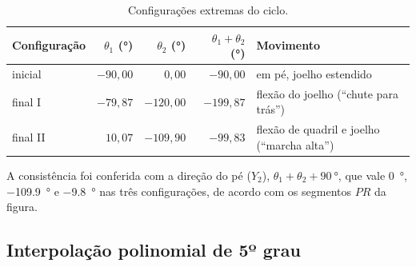 \documentclass[12pt,a4paper,twoside]{article}
\numberwithin{equation}{section}
\begin{document}
\begin{table}[htbp]
  \centering
  \caption{Configurações extremas do ciclo.}
  \label{tab:config}
  \small
  \begin{tabular}{lrrrl}
    \toprule
    Configuração & $\theta_1$ (\si{\degree}) & $\theta_2$ (\si{\degree}) & $\theta_1+\theta_2$ (\si{\degree}) & Movimento \\
    \midrule
    inicial  & $-90{,}00$ & $0{,}00$ & $-90{,}00$ & em pé, joelho estendido \\
    final I  & $-79{,}87$ & $-120{,}00$ & $-199{,}87$ & flexão do joelho (``chute para trás'') \\
    final II & $10{,}07$ & $-109{,}90$ & $-99{,}83$ & flexão de quadril e joelho (``marcha alta'') \\
    \bottomrule
  \end{tabular}
\end{table}

A consistência foi conferida com a direção do pé ($Y_2$), $\theta_1+\theta_2 + \SI{90}{\degree}$, que vale
\SI{0}{\degree}, \SI{-109,9}{\degree} e \SI{-9,8}{\degree} nas três configurações, de acordo com os
segmentos $PR$ da figura.

\subsection{Interpolação polinomial de 5º grau}
\end{document}
